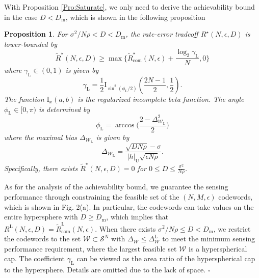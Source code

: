 \documentclass[conference,a4paper]{IEEEtran}
\newenvironment{sproof}{{\indent \indent \it Sketch of Proof:\quad}}{\hfill $\square$\par}
\newtheorem{proposition}{Proposition}
\begin{document}
With Proposition \ref{Pro:Saturate}, we only need to derive the achievability bound in the case $D<D_\mathrm{m}$, which is shown in the following proposition
\begin{proposition}
\label{Pro:achievability-bound}
    For ${\sigma^2}/{N\rho}< D<D_\mathrm{m}$, the rate-error tradeoff $R^\star(N,\epsilon,D)$ is lower-bounded by 
    \begin{equation}
    \tilde{R}^\star(N,\epsilon,D) \geq \max\{\tilde{R}_\mathrm{com}^\star(N,\epsilon)+\frac{\log_2 \gamma_\mathrm{L}}{N},0\}
    \end{equation}
    where $\gamma_\mathrm{L} \in (0,1)$ is given by
    \begin{equation}
    \label{Achievability-rate-loss}
        \gamma_\mathrm{L} = 
        \frac{1}{2}\mathrm{I}_{\sin^2(\phi_\mathrm{L}/2)}(\frac{2N-1}{2},\frac{1}{2}).
    \end{equation}
    The function $\mathrm{I}_x(a,b)$ is the regularized incomplete beta function. The angle $\phi_\mathrm{L}\in[0,\pi)$ is determined by
    \begin{equation}
        \phi_\mathrm{L} = \arccos\bigg(\frac{2-\Delta_{\mathcal{W}_\mathrm{L}}^2}{2}\bigg)
    \end{equation}
    where the maximal bias $\Delta_{\mathcal{W}_\mathrm{L}}$ is given by
    \begin{equation}
        \Delta_{\mathcal{W}_\mathrm{L}} = \frac{\sqrt{DN\rho}-\sigma}{|h|_\mathrm{U}\sqrt{\epsilon N\rho}}.
    \end{equation}
    Specifically, there exists $\tilde{R}^\star(N,\epsilon,D) = 0$ for $0\leq D\leq\frac{\sigma^2}{N\rho}$.
\end{proposition}



\begin{sproof}
As for the analysis of the achievability bound, we guarantee the sensing performance through constraining the feasible set of the $(N,M,\epsilon)$ codewords, which is shown in Fig. 2(a). In particular, the codewords can take values on the entire hypersphere with $D\geq D_\mathrm{m}$, which implies that $R^\mathrm{L}(N,\epsilon,D) = \tilde{R}^\mathrm{L}_\mathrm{com}(N,\epsilon)$. When there exists $\sigma^2/N\rho\leq D <D_\mathrm{m}$, we restrict the codewords to the set $\mathcal{W}\subset\mathcal{S}^N$ with $\Delta_\mathcal{W} \leq \Delta_\mathcal{W}^\mathrm{L}$ to meet the minimum sensing performance requirement, where the largest feasible set $\mathcal{W}$ is a hyperspherical cap. The coefficient $\gamma_\mathrm{L}$ can be viewed as the area ratio of the hyperspherical cap to the hypersphere. Details are omitted due to the lack of space.
\end{sproof}
\end{document}
